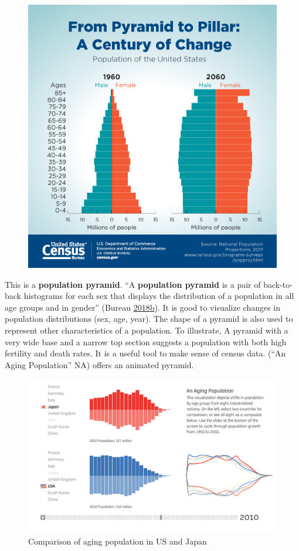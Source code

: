 \documentclass[]{book}
\theoremstyle{definition}
\theoremstyle{definition}
\theoremstyle{definition}
\theoremstyle{remark}
\begin{document}
\begin{figure}
\centering
\includegraphics{images/Pyramid.jpg}
\caption{}
\end{figure}

This is a \textbf{population pyramid}. ``A \textbf{population pyramid}
is a pair of back-to-back histograms for each sex that displays the
distribution of a population in all age groups and in gender'' (Bureau
\protect\hyperlink{ref-population_pyramid}{2018}\protect\hyperlink{ref-population_pyramid}{b}).
It is good to visualize changes in population distributions (sex, age,
year). The shape of a pyramid is also used to represent other
characteristics of a population. To illustrate, A pyramid with a very
wide base and a narrow top section suggests a population with both high
fertility and death rates. It is a useful tool to make sense of census
data. (``An Aging Population'' NA) offers an animated pyramid.

\begin{figure}
\centering
\includegraphics{images/3_1.png}
\caption{Comparison of aging population in US and Japan}
\end{figure}
\end{document}
